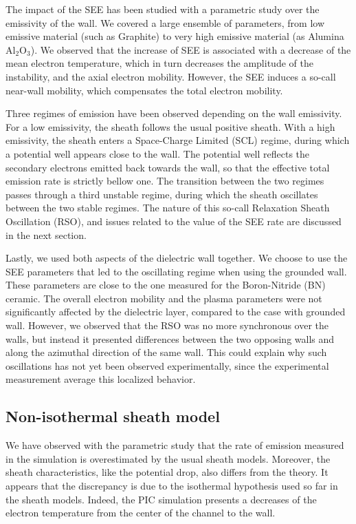 The impact of the SEE has been studied with a parametric study over the emissivity of the wall.
We covered a large ensemble of parameters, from low emissive material (such as Graphite) to very high emissive material (as Alumina Al$_2$O$_3$).
We observed that the increase of SEE is associated with a decrease of the mean electron temperature, which in turn decreases the amplitude of the instability, and the axial electron mobility.
However, the SEE induces a so-call near-wall mobility, which compensates the total electron mobility.

Three regimes of emission have been observed depending on the wall emissivity.
For a low emissivity, the sheath follows the usual positive sheath.
With a high emissivity, the sheath enters a Space-Charge Limited (SCL) regime, during which a potential well appears close to the wall.
The potential well reflects the secondary electrons emitted back towards the wall, so that the effective total emission rate is strictly bellow one.
The transition between the two regimes passes through a third unstable regime, during which the sheath oscillates between the two stable regimes.
The nature of this so-call Relaxation Sheath Oscillation (RSO), and issues related to the value of the SEE rate are discussed in the next section.

Lastly, we used both aspects of the dielectric wall together.
We choose to use the SEE parameters that led to the oscillating regime when using the grounded wall.
These parameters are close to the one measured for the Boron-Nitride (BN) ceramic.
The overall electron mobility and the plasma parameters were not significantly affected by the dielectric layer, compared to the case with grounded wall.
However, we observed that the RSO was no more synchronous over the walls, but instead it presented differences between the two opposing walls and along the azimuthal direction of the same wall.
This could explain why such oscillations has not yet been observed experimentally, since the experimental measurement average this localized behavior.

\subsection{Non-isothermal sheath model}

We have observed with the parametric study that the rate of emission measured in the simulation is overestimated by the usual sheath models.
Moreover, the sheath characteristics, like the potential drop, also differs from the theory.
It appears that the discrepancy is due to the isothermal hypothesis used so far in the sheath models.
Indeed, the PIC simulation presents a decreases of the electron temperature from the center of the channel to the wall.


